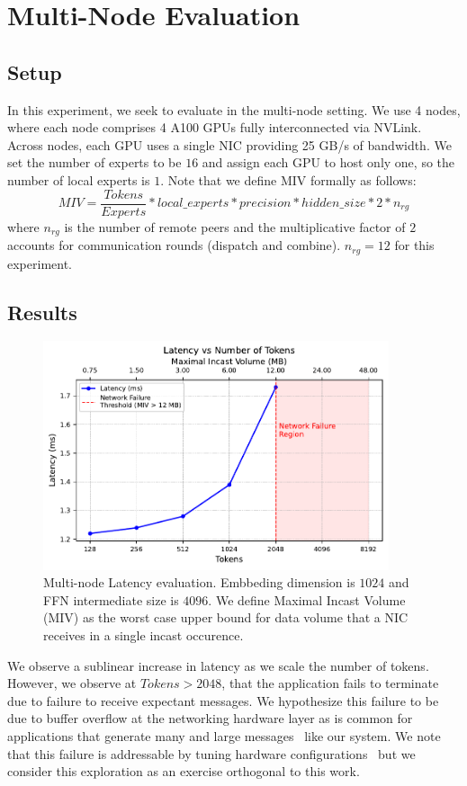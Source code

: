 \section{Multi-Node Evaluation}\label{sec:multi-node-evaluation}
\subsection{Setup}\label{subsec:setup}
In this experiment, we seek to evaluate \sysname in the multi-node setting.
We use 4 nodes, where each node comprises 4 A100 GPUs fully interconnected via NVLink.
Across nodes, each GPU uses a single NIC providing 25 GB/s of bandwidth.
We set the number of experts to be $16$ and assign each GPU to host only one,
so the number of local experts is $1$.
Note that we define MIV formally as follows:
\[
    MIV = \frac{Tokens}{Experts} * local\_{experts} * precision * hidden\_size * 2 * n_{rg}
\]
where $n_{rg}$ is the number of remote peers and the multiplicative
factor of $2$ accounts for communication rounds (dispatch and combine).
$n_{rg} = 12$ for this experiment.
\subsection{Results}\label{subsec:results}
\begin{figure} [!ht]
    \centering
    \includegraphics[width=4in,keepaspectratio]{figures/multi_node_fail}
    \caption{Multi-node Latency evaluation.
    Embbeding dimension is $1024$ and FFN intermediate size is $4096$.
    We define Maximal Incast Volume (MIV) as the worst case upper bound for data volume that a
    NIC receives in a single incast occurence.}
    \label{fig:multi_fail}
\end{figure}
We observe a sublinear increase in latency as we scale the number of tokens.
However, we observe at $Tokens > 2048$, that the application fails to terminate
due to failure to receive expectant messages.
We hypothesize this failure to be due to buffer overflow at the networking hardware layer as is common for applications
that generate many and large messages~\cite{nerscNetworkNERSC} like our system.
We note that this failure is addressable by tuning hardware configurations~\cite{ofiwgFi_cxi7} but we consider
this exploration as an exercise orthogonal to this work.
\clearpage